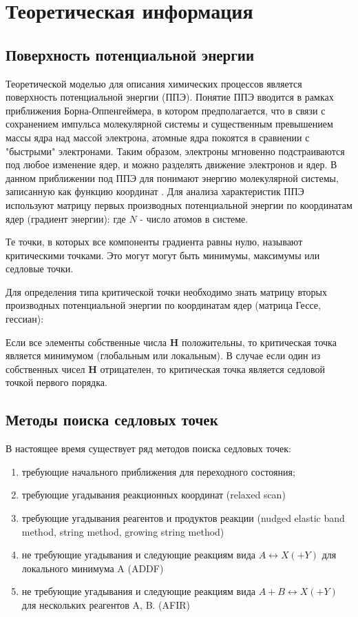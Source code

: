 \section{Теоретическая информация}
\subsection{Поверхность потенциальной энергии}
Теоретической моделью для описания химических процессов является поверхность потенциальной энергии (ППЭ). Понятие ППЭ вводится в рамках приближения Борна-Оппенгеймера, в котором предполагается, что в связи с сохранением импульса молекулярной системы и существенным превышением массы ядра над массой электрона, атомные ядра покоятся в сравнении с "быстрыми" электронами. Таким образом, электроны мгновенно подстраиваются под любое изменение ядер, и можно разделять движение электронов и ядер. В данном приближении под ППЭ для понимают энергию молекулярной системы, записанную как функцию координат . Для анализа характеристик ППЭ используют матрицу первых производных потенциальной энергии по координатам ядер (градиент энергии):
где $N$ - число атомов в системе.

Те точки, в которых все компоненты градиента равны нулю, называют критическими точками. Это могут могут быть минимумы, максимумы или седловые точки. 

Для определения типа критической точки необходимо знать матрицу вторых производных потенциальной энергии по координатам ядер (матрица Гессе, гессиан):

Если все элементы собственные числа \textbf{H} положительны, то критическая точка является минимумом (глобальным или локальным). В случае если один из собственных чисел \textbf{H} отрицателен, то критическая точка является седловой точкой первого порядка.

\subsection{Методы поиска седловых точек}
В настоящее время существует ряд методов поиска седловых точек:
\begin{enumerate}
    \item требующие начального приближения для переходного состояния;
    \item требующие угадывания реакционных координат (relaxed scan)
    \item требующие угадывания реагентов и продуктов реакции (nudged elastic band method, string method, growing string method)
    \item не требующие угадывания и следующие реакциям вида $A \leftrightarrow X(+Y)$ для локального минимума A (ADDF)
    \item не требующие угадывания и следующие реакциям вида $A + B \leftrightarrow X(+Y)$ для нескольких реагентов A, B. (AFIR)
\end{enumerate}